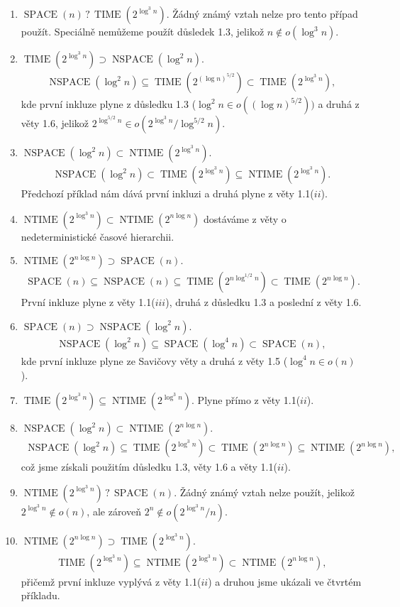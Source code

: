 \documentclass{scrartcl}
\DeclareMathOperator{\tm}{\text{TIME}}
\DeclareMathOperator{\s}{\text{SPACE}}
\DeclareMathOperator{\ntm}{\text{NTIME}}
\DeclareMathOperator{\ns}{\text{NSPACE}}
\begin{document}
    \begin{enumerate}
        \item $\s(n)\,?\,\tm(2^{\log^3 n})$. Žádný známý vztah nelze pro tento případ použít. Speciálně nemůžeme použít důsledek 1.3, jelikož $n \notin o(\log^3 n)$.
        \item $\tm(2^{\log^3 n}) \supset \ns(\log^2 n)$. 
        \begin{align*}
            \ns(\log^2 n) \subseteq \tm(2^{(\log n)^{5/2}}) \subset \tm(2^{\log^3 n}), 
        \end{align*}
        kde první inkluze plyne z důsledku 1.3 ($\log^2 n \in o((\log n)^{5/2}))$ a druhá z věty 1.6, jelikož $2^{\log^{5/2} n} \in o(2^{\log^3 n}/\log^{5/2} n)$.
        \item $\ns(\log^2 n) \subset \ntm(2^{\log^3 n})$. 
        \begin{align*}
            \ns(\log^2 n) \subset \tm(2^{\log^3 n}) \subseteq \ntm(2^{\log^3 n}).
        \end{align*}
        Předchozí příklad nám dává první inkluzi a druhá plyne z věty 1.1($ii$).
        \item $\ntm(2^{\log^3 n}) \subset \ntm(2^{n\log n})$ dostáváme z věty o nedeterministické časové hierarchii.
        \item $\ntm(2^{n\log n}) \supset \s(n)$.
        \begin{align*}
            \s(n) \subseteq \ns(n) \subseteq \tm(2^{n\log^{1/2} n}) \subset \tm(2^{n\log n}). 
        \end{align*}
        První inkluze plyne z věty 1.1($iii$), druhá z důsledku 1.3 a poslední z věty 1.6.
        \item $\s(n) \supset \ns(\log^2 n)$.
        \begin{align*}
            \ns(\log^2 n) \subseteq \s(\log^4 n) \subset \s(n),
        \end{align*}
        kde první inkluze plyne ze Savičovy věty a druhá z věty 1.5 ($\log^4 n \in o(n)$).
        \item $\tm(2^{\log^3 n}) \subseteq \ntm(2^{\log^3 n})$. Plyne přímo z věty 1.1($ii$).
        \item $\ns(\log^2 n) \subset \ntm(2^{n\log n})$.
        \begin{align*}
            \ns(\log^2 n) \subseteq \tm(2^{\log^3 n}) \subset \tm(2^{n\log n}) \subseteq \ntm(2^{n\log n}),
        \end{align*}
        což jsme získali použitím důsledku 1.3, věty 1.6 a věty 1.1($ii$).
        \item $\ntm(2^{\log^3 n})\, ?\, \s(n)$. Žádný známý vztah nelze použít, jelikož $2^{\log^3 n} \notin o(n)$, ale zároveň $2^n \notin o(2^{\log^3 n}/n)$.
        \item $\ntm(2^{n\log n}) \supset \tm(2^{\log^3 n})$.
        \begin{align*}
            \tm(2^{\log^3 n}) \subseteq \ntm(2^{\log^3 n}) \subset \ntm(2^{n\log n}),
        \end{align*}
        přičemž první inkluze vyplývá z věty 1.1($ii$) a druhou jsme ukázali ve čtvrtém příkladu.
    \end{enumerate}
\end{document}
